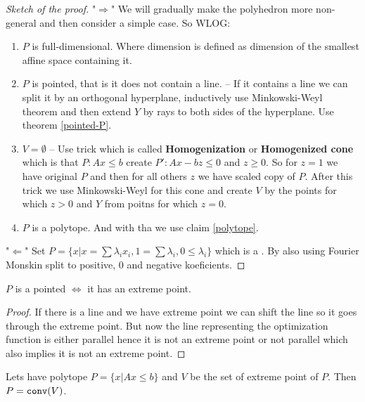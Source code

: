 \begin{proof}[Sketch of the proof]
	"$\Rightarrow$" We will gradually make the polyhedron more non-general and then consider a simple case. So WLOG:

	\begin{enumerate}
		\item $P$ is full-dimensional. Where dimension is defined as dimension of the smallest affine space containing it.
		\item $P$ is pointed, that is it does not contain a line. -- If it contains a line we can split it by an orthogonal hyperplane, inductively use Minkowski-Weyl theorem and then extend $Y$ by rays to both sides of the hyperplane. Use theorem \ref{pointed-P}.
		\item $V = \emptyset$ -- Use trick which is called \textbf{Homogenization} or \textbf{Homogenized cone} which is that $P : Ax \leq b$ create $P' : Ax - bz \leq 0$ and $z \geq 0$. So for $z = 1$ we have original $P$ and then for all others $z$ we have scaled copy of $P$. After this trick we use Minkowski-Weyl for this cone and create $V$ by the points for which $z > 0$ and $Y$ from poitns for which $z = 0$.
		\item $P$ is a polytope. And with tha we use claim \ref{polytope}.
	\end{enumerate}

	"$\Leftarrow$" Set $P = \{x | x = \sum \lambda_{i} x_{i}, 1 = \sum \lambda_{i}, 0 \leq \lambda_{i}\}$ which is a . By also using Fourier Monskin split to positive, 0 and negative koeficients.
\end{proof}

\begin{thm}
	$P$ is a pointed $\iff$ it has an extreme point.
	\label{pointed-P}
\end{thm}

\begin{proof}
	If there is a line and we have extreme point we can shift the line so it goes through the extreme point. But now the line representing the optimization function is either parallel hence it is not an extreme point or not parallel which also implies it is not an extreme point.
\end{proof}

\begin{claim}
Lets have polytope $P = \{x | A x \leq b\}$ and $V$ be the set of extreme point of $P$. Then $P = \mathtt{conv}(V)$.
	\label{polytope}
\end{claim}

